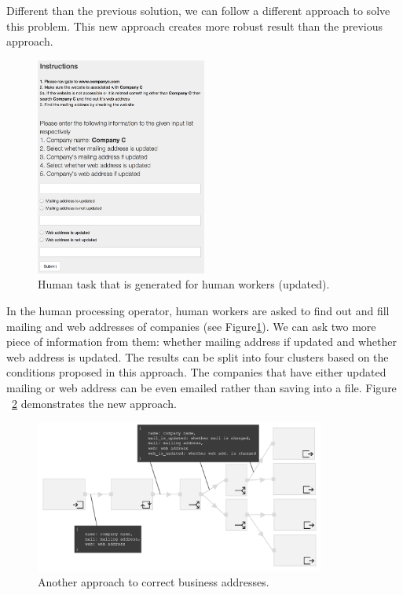 

Different than the previous solution, we can follow a different approach to solve this problem. This new approach creates more robust result than the previous approach.

\begin{figure}[ht]
	\centering
	\includegraphics[width=0.5\textwidth]{figures/scenarios/scenario1_2h.png}
	\caption{Human task that is generated for human workers (updated).}
	\label{fig:scenario1.2h}
\end{figure}

In the human processing operator, human workers are asked to find out and fill mailing and web addresses of companies (see Figure\ref{fig:scenario1.2h}). We can ask two more piece of information from them: whether mailing address if updated and whether web address is updated. The results can be split into four clusters based on the conditions proposed in this approach. The companies that have either updated mailing or web address can be even emailed rather than saving into a file. Figure ~\ref{fig:scenario1.2} demonstrates the new approach.

\begin{figure}[ht]
	\centering
	\includegraphics[width=0.85\textwidth]{figures/scenarios/scenario1_2a.png}
	\caption{Another approach to correct business addresses.}
	\label{fig:scenario1.2}
\end{figure}

